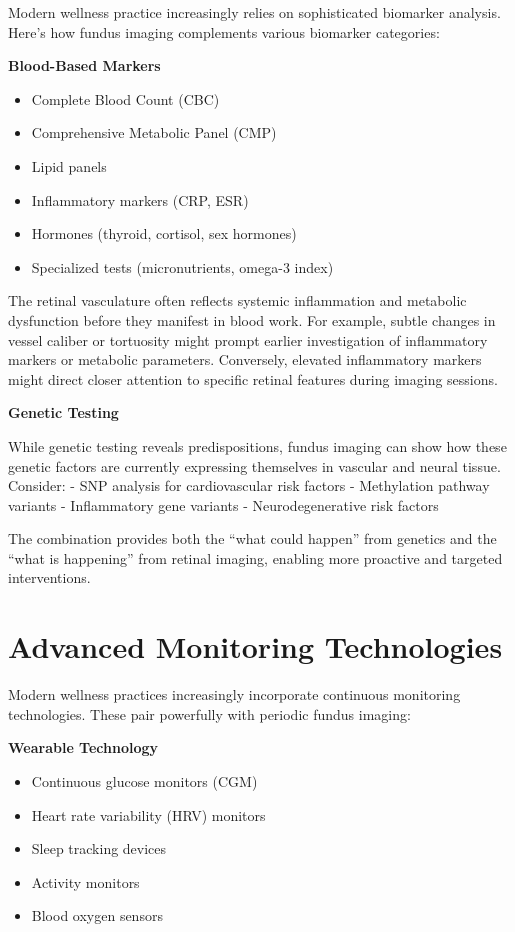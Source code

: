 \documentclass[
  Letterpaper,
]{scrbook}
\providecommand{\tightlist}{%
  \setlength{\itemsep}{0pt}\setlength{\parskip}{0pt}}\usepackage{longtable,booktabs,array}
\begin{document}
Modern wellness practice increasingly relies on sophisticated biomarker
analysis. Here's how fundus imaging complements various biomarker
categories:

\textbf{Blood-Based Markers}

\begin{itemize}
\tightlist
\item
  Complete Blood Count (CBC)
\item
  Comprehensive Metabolic Panel (CMP)
\item
  Lipid panels
\item
  Inflammatory markers (CRP, ESR)
\item
  Hormones (thyroid, cortisol, sex hormones)
\item
  Specialized tests (micronutrients, omega-3 index)
\end{itemize}

The retinal vasculature often reflects systemic inflammation and
metabolic dysfunction before they manifest in blood work. For example,
subtle changes in vessel caliber or tortuosity might prompt earlier
investigation of inflammatory markers or metabolic parameters.
Conversely, elevated inflammatory markers might direct closer attention
to specific retinal features during imaging sessions.

\textbf{Genetic Testing}

While genetic testing reveals predispositions, fundus imaging can show
how these genetic factors are currently expressing themselves in
vascular and neural tissue. Consider: - SNP analysis for cardiovascular
risk factors - Methylation pathway variants - Inflammatory gene variants
- Neurodegenerative risk factors

The combination provides both the ``what could happen'' from genetics
and the ``what is happening'' from retinal imaging, enabling more
proactive and targeted interventions.

\section{Advanced Monitoring
Technologies}\label{advanced-monitoring-technologies}

Modern wellness practices increasingly incorporate continuous monitoring
technologies. These pair powerfully with periodic fundus imaging:

\textbf{Wearable Technology}

\begin{itemize}
\tightlist
\item
  Continuous glucose monitors (CGM)
\item
  Heart rate variability (HRV) monitors
\item
  Sleep tracking devices
\item
  Activity monitors
\item
  Blood oxygen sensors
\end{itemize}
\end{document}
